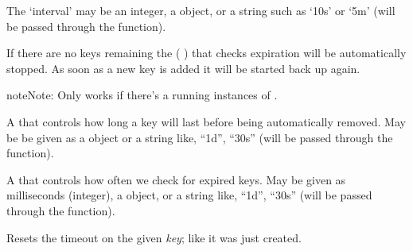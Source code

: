 \documentclass[letterpaper,10pt,openany]{sphinxmanual}
\begin{document}
\begin{fulllineitems}
The `interval' may be an integer, a  object, or a string
such as `10s' or `5m' (will be passed through the {\hyperref[Developer/utils:gateone.core.utils.convert_to_timedelta]{}}
function).

If there are no keys remaining the  (
) that checks expiration will be automatically stopped.
As soon as a new key is added it will be started back up again.

\begin{notice}{note}{Note:}
Only works if there's a running instances of .
\end{notice}

\begin{fulllineitems}
\label{Developer/utils:gateone.core.utils.AutoExpireDict.timeout}
A  that controls how long a key will last before being
automatically removed.  May be be given as a 
object or a string like, ``1d'', ``30s'' (will be passed through the
{\hyperref[Developer/utils:gateone.core.utils.convert_to_timedelta]{}} function).

\end{fulllineitems}


\begin{fulllineitems}
\label{Developer/utils:gateone.core.utils.AutoExpireDict.interval}
A  that controls how often we check for expired keys.  May be
given as milliseconds (integer), a  object, or a
string like, ``1d'', ``30s'' (will be passed through the
{\hyperref[Developer/utils:gateone.core.utils.convert_to_timedelta]{}} function).

\end{fulllineitems}


\begin{fulllineitems}
\label{Developer/utils:gateone.core.utils.AutoExpireDict.renew}
Resets the timeout on the given \emph{key}; like it was just created.


\end{fulllineitems}
\end{fulllineitems}
\end{document}
